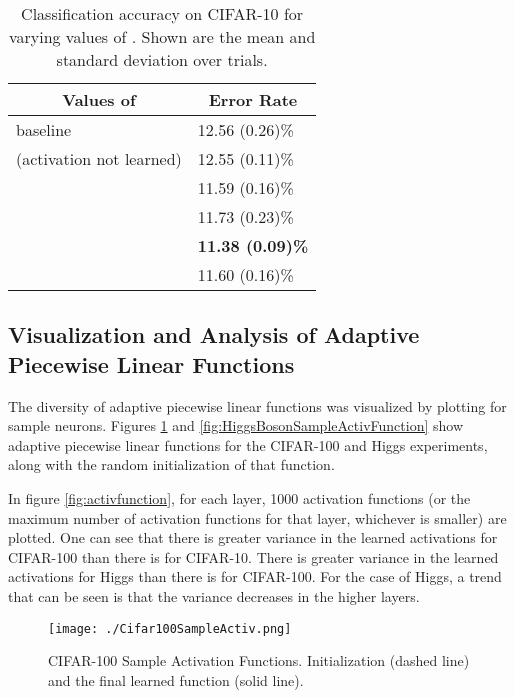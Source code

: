 \documentclass{article} \usepackage{iclr2015,times}
\begin{document}
\begin{table}[h]
\caption{Classification accuracy on CIFAR-10 for varying values of . Shown are the mean and standard deviation over  trials.}
\label{inputcoeff}
\begin{center}
\begin{tabular}{ll}
\multicolumn{1}{c}{\bf Values of }  &\multicolumn{1}{c}{\bf Error Rate}
\\ \hline
 baseline & 12.56 (0.26)\%\\
 \hline
  (activation not learned) & 12.55 (0.11)\%\\
  & 11.59 (0.16)\%\\
 \hline
  & 11.73 (0.23)\%\\
 \hline
  & \bf11.38 (0.09)\%\\
\hline
  & 11.60 (0.16)\%\\
 \hline
\end{tabular}
\end{center}
\end{table}

\subsection{Visualization and Analysis of Adaptive Piecewise Linear Functions}
\label{sec:visualize}
The diversity of adaptive piecewise linear functions was visualized by plotting  for sample neurons. Figures \ref{fig:Cifar100SampleActivFunction} and \ref{fig:HiggsBosonSampleActivFunction} show adaptive piecewise linear functions for the CIFAR-100 and Higgs experiments, along with the random initialization of that function.

In figure \ref{fig:activfunction}, for each layer, 1000 activation functions (or the maximum number of activation functions for that layer, whichever is smaller) are plotted. One can see that there is greater variance in the learned activations for CIFAR-100 than there is for CIFAR-10. There is greater variance in the learned activations for Higgs than there is for CIFAR-100. For the case of Higgs, a trend that can be seen is that the variance decreases in the higher layers.

\begin{figure}[h]
\center
\texttt{[image: ./Cifar100SampleActiv.png]}
\caption{CIFAR-100 Sample Activation Functions. Initialization (dashed line) and the final learned function (solid line).}
\label{fig:Cifar100SampleActivFunction}
\end{figure}
\end{document}
